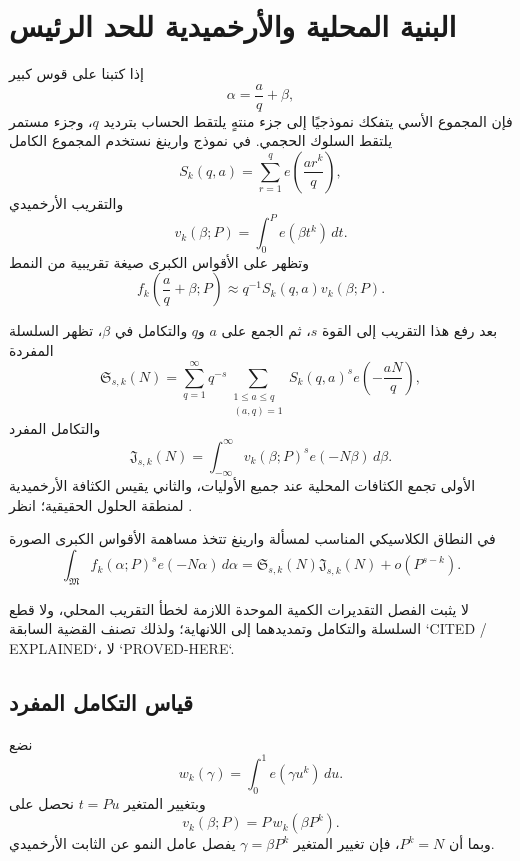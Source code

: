 \section{البنية المحلية والأرخميدية للحد الرئيس}

إذا كتبنا على قوس كبير
\[
\alpha=\frac aq+\beta,
\]
فإن المجموع الأسي يتفكك نموذجيًا إلى جزء منتهٍ يلتقط الحساب بترديد $q$، وجزء مستمر يلتقط السلوك الحجمي. في نموذج وارينغ نستخدم المجموع الكامل
\[
S_k(q,a)=\sum_{r=1}^{q}e\!\left(\frac{a r^k}{q}\right),
\]
والتقريب الأرخميدي
\[
v_k(\beta;P)=\int_0^P e(\beta t^k)\,dt.
\]
وتظهر على الأقواس الكبرى صيغة تقريبية من النمط
\[
f_k\!\left(\frac aq+\beta;P\right)
\approx
q^{-1}S_k(q,a)v_k(\beta;P).
\]

بعد رفع هذا التقريب إلى القوة $s$، ثم الجمع على $a$ و$q$ والتكامل في $\beta$، تظهر السلسلة المفردة
\[
\mathfrak S_{s,k}(N)
=
\sum_{q=1}^{\infty}
q^{-s}
\sum_{\substack{1\le a\le q\\(a,q)=1}}
S_k(q,a)^s e\!\left(-\frac{aN}{q}\right),
\]
والتكامل المفرد
\[
\mathfrak J_{s,k}(N)
=
\int_{-\infty}^{\infty}
v_k(\beta;P)^s e(-N\beta)\,d\beta.
\]
الأولى تجمع الكثافات المحلية عند جميع الأوليات، والثاني يقيس الكثافة الأرخميدية لمنطقة الحلول الحقيقية؛ انظر \cite{HardyLittlewood1922Waring,Vaughan1997HardyLittlewood}.

\begin{proposition}
\label{prop:major-arc-structure}
في النطاق الكلاسيكي المناسب لمسألة وارينغ تتخذ مساهمة الأقواس الكبرى الصورة
\[
\int_{\mathfrak M} f_k(\alpha;P)^s e(-N\alpha)\,d\alpha
=
\mathfrak S_{s,k}(N)\mathfrak J_{s,k}(N)
+o(P^{s-k}).
\]
\end{proposition}

لا يثبت الفصل التقديرات الكمية الموحدة اللازمة لخطأ التقريب المحلي، ولا قطع السلسلة والتكامل وتمديدهما إلى اللانهاية؛ ولذلك تصنف القضية السابقة `CITED / EXPLAINED`، لا `PROVED-HERE`.

\subsection{قياس التكامل المفرد}

نضع
\[
w_k(\gamma)=\int_0^1 e(\gamma u^k)\,du.
\]
وبتغيير المتغير $t=Pu$ نحصل على
\[
v_k(\beta;P)=P\,w_k(\beta P^k).
\]
وبما أن $P^k=N$، فإن تغيير المتغير $\gamma=\beta P^k$ يفصل عامل النمو عن الثابت الأرخميدي.

